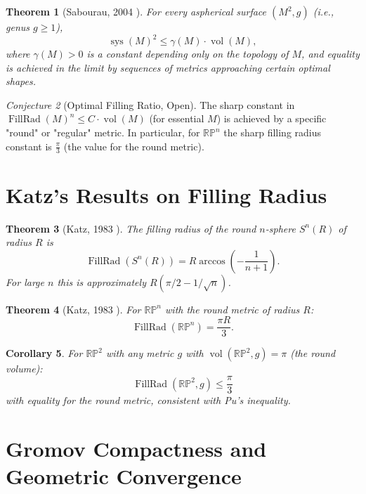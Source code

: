 \documentclass[12pt,a4paper]{amsart}
\newtheorem{theorem}{Theorem}[section]
\newtheorem{corollary}[theorem]{Corollary}
\theoremstyle{definition}
\theoremstyle{remark}
\newtheorem{conjecture}[theorem]{Conjecture}
\DeclareMathOperator{\sys}{sys}
\DeclareMathOperator{\FillRad}{FillRad}
\DeclareMathOperator{\vol}{vol}
\newcommand{\RP}{\mathbb{RP}}
\begin{document}
\begin{theorem}[Sabourau, 2004 \cite{Sabourau2004}]
For every aspherical surface $(M^2, g)$ (i.e., genus $g \ge 1$),
\[
  \sys(M)^2 \le \gamma(M) \cdot \vol(M),
\]
where $\gamma(M) > 0$ is a constant depending only on the topology of $M$,
and equality is achieved in the limit by sequences of metrics approaching
certain optimal shapes.
\end{theorem}

\begin{conjecture}[Optimal Filling Ratio, Open]
\label{conj:filling}
The sharp constant in $\FillRad(M)^n \le C \cdot \vol(M)$ (for essential
$M$) is achieved by a specific "round" or "regular" metric.  In particular,
for $\RP^n$ the sharp filling radius constant is $\tfrac{\pi}{3}$ (the value
for the round metric).
\end{conjecture}

\section{Katz's Results on Filling Radius}

\begin{theorem}[Katz, 1983 \cite{Katz1983}]
The filling radius of the round $n$-sphere $S^n(R)$ of radius $R$ is
\[
  \FillRad(S^n(R)) = R \arccos\!\left(-\frac{1}{n+1}\right).
\]
For large $n$ this is approximately $R(\pi/2 - 1/\sqrt{n})$.
\end{theorem}

\begin{theorem}[Katz, 1983 \cite{Katz1983}]
For $\RP^n$ with the round metric of radius $R$:
\[
  \FillRad(\RP^n) = \frac{\pi R}{3}.
\]
\end{theorem}

\begin{corollary}
For $\RP^2$ with any metric $g$ with $\vol(\RP^2, g) = \pi$ (the round
volume):
\[
  \FillRad(\RP^2, g) \le \frac{\pi}{3}
\]
with equality for the round metric, consistent with Pu's inequality.
\end{corollary}

\section{Gromov Compactness and Geometric Convergence}
\end{document}
